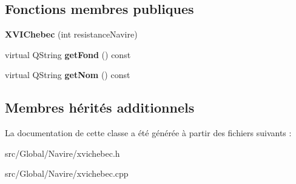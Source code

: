 \subsection*{Fonctions membres publiques}
\begin{DoxyCompactItemize}
\item 
{\bfseries X\+V\+I\+Chebec} (int resistance\+Navire)\hypertarget{class_x_v_i_chebec_ae17710ff3c99cd64a25c2559e7f1bc50}{}\label{class_x_v_i_chebec_ae17710ff3c99cd64a25c2559e7f1bc50}

\item 
virtual Q\+String {\bfseries get\+Fond} () const \hypertarget{class_x_v_i_chebec_ad7ee8f1a16832307b56eee644ac71bbd}{}\label{class_x_v_i_chebec_ad7ee8f1a16832307b56eee644ac71bbd}

\item 
virtual Q\+String {\bfseries get\+Nom} () const \hypertarget{class_x_v_i_chebec_a519a55a9fe50c52085423224caed0974}{}\label{class_x_v_i_chebec_a519a55a9fe50c52085423224caed0974}

\end{DoxyCompactItemize}
\subsection*{Membres hérités additionnels}


La documentation de cette classe a été générée à partir des fichiers suivants \+:\begin{DoxyCompactItemize}
\item 
src/\+Global/\+Navire/xvichebec.\+h\item 
src/\+Global/\+Navire/xvichebec.\+cpp\end{DoxyCompactItemize}

